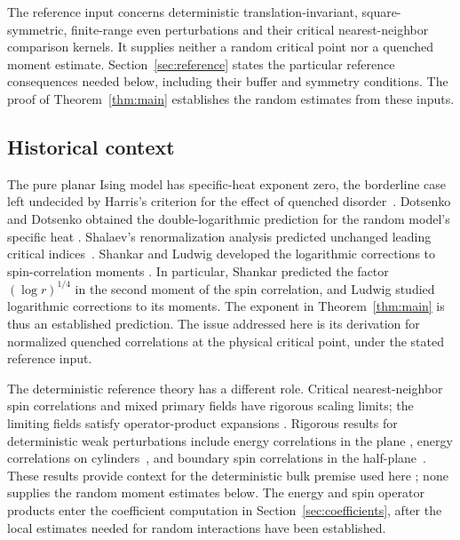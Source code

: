 The reference input concerns deterministic translation-invariant,
square-symmetric, finite-range even perturbations and their critical
nearest-neighbor comparison kernels. It supplies neither a random critical
point nor a quenched moment estimate. Section~\ref{sec:reference} states
the particular reference consequences needed below, including their
buffer and symmetry conditions. The proof of
Theorem~\ref{thm:main} establishes the random estimates from these inputs.

\subsection{Historical context}

The pure planar Ising model has specific-heat exponent zero, the borderline
case left undecided by Harris's criterion for the effect of quenched
disorder~\cite[Section~5]{Harris1974}. Dotsenko and Dotsenko obtained the
double-logarithmic prediction for the random model's specific heat
\cite{DotsenkoDotsenko1983}. Shalaev's renormalization analysis predicted
unchanged leading critical indices~\cite{Shalaev1984}. Shankar and Ludwig
developed the logarithmic corrections to spin-correlation moments
\cite{Shankar1987,Ludwig1990}. In particular, Shankar predicted
the factor $(\log r)^{1/4}$ in the second moment of the spin correlation,
and Ludwig studied logarithmic corrections to its moments. The exponent
in Theorem~\ref{thm:main} is thus an established prediction. The issue
addressed here is its derivation for normalized quenched correlations at
the physical critical point, under the stated reference input.

The deterministic reference theory has a different role. Critical
nearest-neighbor spin correlations and mixed primary fields have rigorous
scaling limits; the limiting fields satisfy operator-product expansions
\cite{CHI2015,CHI2023}. Rigorous results for deterministic weak
perturbations include energy correlations in the plane
\cite{GGM2012}, energy correlations on cylinders~\cite{AGG2023}, and
boundary spin correlations in the half-plane~\cite{CGG2025}. These results
provide context for the deterministic bulk premise used here
\cite{ReferenceIsing}; none supplies the random moment estimates below.
The energy and spin operator products enter the coefficient computation
in Section~\ref{sec:coefficients}, after the local estimates needed for
random interactions have been established.

